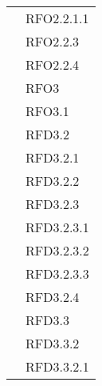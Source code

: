 \begin{longtable}{|>{\centering}m{10cm}|m{3cm}<{\centering}|}
& RFO2.2.1.1\\
& RFO2.2.3\\
& RFO2.2.4\\
& RFO3\\
& RFO3.1\\
& RFD3.2\\
& RFD3.2.1\\
& RFD3.2.2\\
& RFD3.2.3\\
& RFD3.2.3.1\\
& RFD3.2.3.2\\
& RFD3.2.3.3\\
& RFD3.2.4\\
& RFD3.3\\
& RFD3.3.2\\
& RFD3.3.2.1\\ \hline


\end{longtable}
